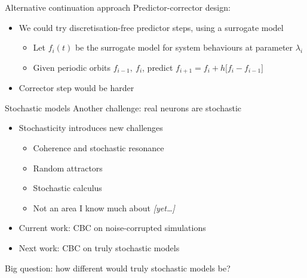 \documentclass[presentation]{beamer}
\begin{document}
\begin{frame}[label={sec:orge747583}]{Alternative continuation approach}
Predictor-corrector design:
\vfill
\begin{itemize}
\item We could try discretisation-free predictor steps, using a surrogate model
\begin{itemize}
\item Let \(f_i(t)\) be the surrogate model for system behaviours at parameter \(\lambda_i\)
\item Given periodic orbits \(f_{i-1},~f_i\), predict \(f_{i+1} = f_i + h \big[f_i - f_{i-1}\big]\)
\end{itemize}
\end{itemize}
\vfill
\begin{itemize}
\item Corrector step would be harder
\end{itemize}
\end{frame}

\begin{frame}[label={sec:org764dcc9}]{Stochastic models}
Another challenge: real neurons are stochastic
\vfill
\begin{itemize}
\item Stochasticity introduces new challenges
\begin{itemize}
\item Coherence and stochastic resonance
\item Random attractors
\item Stochastic calculus
\item Not an area I know much about \emph{[yet\ldots{}]}
\end{itemize}
\item Current work: CBC on noise-corrupted simulations
\item Next work: CBC on truly stochastic models
\end{itemize}

\vfill

Big question: how different would truly stochastic models be?
\end{frame}
\end{document}
